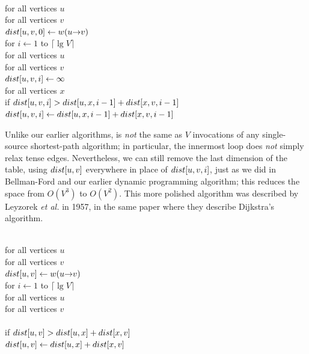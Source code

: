 \begin{pseudocode}
\\
for all vertices $u$\\
\Indent for all vertices $v$\\
\Indent\Indent $dist[u, v, 0] \gets w(u\mathord{\rightarrow}v)$\\
for $i \gets 1$ to $\lceil \lg V\rceil$ \\
\Indent for all vertices $u$\\
\Indent\Indent for all vertices $v$\\
\Indent\Indent\Indent $dist[u, v, i] \gets \infty$\\
\Indent\Indent\Indent for all vertices $x$\\
\Indent\Indent\Indent\Indent if $dist[u, v, i] > dist[u, x, i - 1] + dist[x, v, i - 1]$\\
\Indent\Indent\Indent\Indent\Indent $dist[u, v, i] \gets dist[u, x, i - 1] + dist[x, v, i - 1]$
\end{pseudocode}

Unlike our earlier algorithms,  is \textit{not} the same as $V$ invocations of any single-source shortest-path algorithm; in particular, the innermost loop does \textit{not} simply relax tense edges.
Nevertheless, we can still remove the last dimension of the table, using $dist[u, v]$ everywhere in place of $dist[u, v, i]$, just as we did in Bellman-Ford and our earlier dynamic programming algorithm; this reduces the space from $O(V^3)$ to $O(V^2)$.
This more polished algorithm was described by Leyzorek \textit{et al.} in 1957, in the same paper where they describe Dijkstra’s algorithm.

\begin{pseudocode}
\\
for all vertices $u$\\
\Indent for all vertices $v$\\
\Indent\Indent $dist[u, v] \gets w(u\mathord{\rightarrow}v)$\\
for $i \gets 1$ to $\lceil \lg V \rceil$ \\
\Indent for all vertices $u$\\
\Indent\Indent for all vertices $v$\\
\Indent\Indent{}\\
\Indent\Indent\Indent\Indent if $dist[u, v] > dist[u, x] + dist[x, v]$\\
\Indent\Indent\Indent\Indent\Indent $dist[u, v] \gets dist[u, x] + dist[x, v]$
\end{pseudocode}



